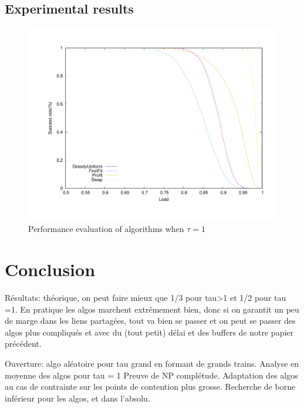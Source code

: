 \documentclass[10pt, conference, letterpaper]{IEEEtran}
\begin{document}
\subsection{Experimental results} \label{sec:perf_small}


\begin{figure}
\begin{center}
\includegraphics[scale=0.3]{success_tau1}
\end{center}
\caption{Performance evaluation of algorithms when $\tau = 1$}
\label{fig:tau1}
\end{figure}

\section{Conclusion}

Résultats:  théorique, on peut faire mieux que 1/3 pour tau>1 et 1/2 pour tau =1.
En pratique les algos marchent extrémement bien, donc si on garantit un peu de marge
dans les liens partagées, tout va bien se passer et on peut se passer des algos plus compliqués 
et avec du (tout petit) délai et des buffers de notre papier précédent. 

Ouverture: algo aléatoire pour tau grand en formant de grands trains.
Analyse en moyenne des algos pour tau = 1
Preuve de NP complétude. Adaptation des algos au cas de contrainte sur les points de contention
plus grosse.
Recherche de borne inférieur pour les algos, et dans l'absolu.




 
\end{document}

